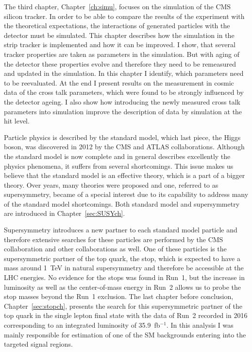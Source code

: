 The third chapter, Chapter~\ref{ch:simu}, focuses on the simulation of the CMS silicon tracker. In order to be able to compare the results of the experiment with the theoretical expectations, the interactions of generated particles with the detector must be simulated. This chapter describes how the simulation in the strip tracker is implemented and how it can be improved. I show, that several tracker properties are taken as parameters in the simulation. But with aging of the detector these properties evolve and therefore they need to be remeasured and updated in the simulation. In this chapter I identify, which parameters need to be reevaluated. At the end I present results on the measurement in cosmic data of the cross talk parameters,  which were found to be strongly influenced by the detector ageing. I also show how introducing the newly measured cross talk parameters into simulation improve the description of data by simulation at the hit level.

Particle physics is described by the standard model, which last piece, the Higgs boson, was discovered in 2012 by the CMS and ATLAS collaborations. Although the standard model is now complete and in general describes excellently the physics phenomena, it suffers from several shortcomings. This issue makes us believe that the standard model is an effective theory, which is a part of a bigger theory. Over years, many theories  were proposed and one, referred to as supersymmetry, became of a special interest due to its capability to address many of the standard model shortcomings. Both standard model and supersymmetry are introduced in Chapter~\ref{sec:SUSYch}.

Supersymmetry introduces a new partner to each standard model particle and therefore extensive searches for these particles are performed by the CMS collaboration and other collaborations as well. One of these particles is the supersymmetric partner of the top quark, the stop, which is expected to have a mass around 1~TeV in natural supersymmetry and therefore be accessible at the LHC energies. No evidence for the stops was  found in Run~1, but the increase in luminosity as well as the center-of-mass energy in Run~2 allows us to probe the stop masses beyond the Run~1 exclusion. The last chapter before conclusion, Chapter~\ref{sec:stopch},  presents the search for this supersymmetric partner of the top quark in the single lepton final state with the data of Run~2 recorded in 2016 corresponding to an integrated luminosity of 35.9~fb$^{-1}$. In this analysis I was mainly responsible for estimation of one of the SM backgrounds entering into the targeted signal regions. 

